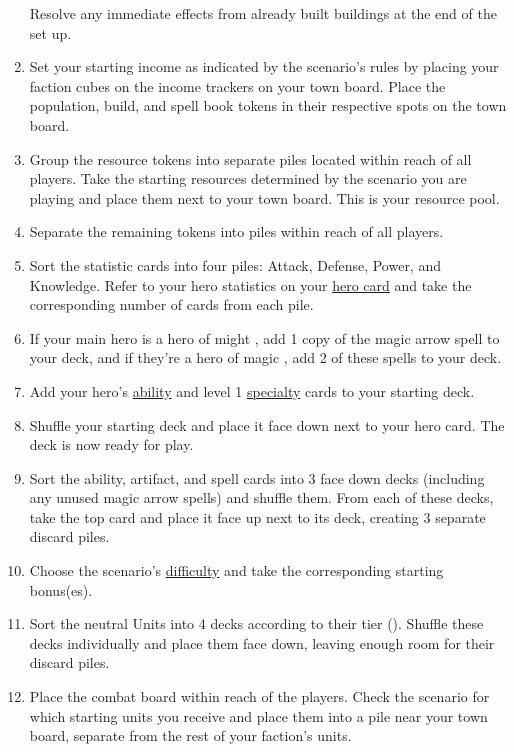 \begin{enumerate}
    Resolve any immediate effects from already built buildings at the end of the set up.
  \item Set your starting income as indicated by the scenario’s rules by placing your faction cubes on the income trackers on your town board.
    Place the population, build, and spell book tokens in their respective spots on the town board.
  \item Group the resource tokens into separate piles located within reach of all players.
    Take the starting resources determined by the scenario you are playing and place them next to your town board.
    This is your resource pool.
  \item Separate the remaining tokens into piles within reach of all players.
  \item Sort the statistic cards into four piles: Attack, Defense, Power, and Knowledge.
    Refer to your hero statistics on your \hyperlink{Herocard}{hero card} and take the corresponding number of cards from each pile.
  \item If your main hero is a hero of might , add 1 copy of the magic arrow spell to your deck, and if they’re a hero of magic , add 2 of these spells to your deck.
  \item Add your hero’s \hyperlink{Ability}{ability} and level 1 \hyperlink{Specialty}{specialty} cards to your starting deck.
  \item Shuffle your starting deck and place it face down next to your hero card.
    The deck is now ready for play.
  \item Sort the ability, artifact, and spell cards into 3 face down decks (including any unused magic arrow spells) and shuffle them.
    From each of these decks, take the top card and place it face up next to its deck, creating 3 separate discard piles.
  \item Choose the scenario’s \hyperlink{Difficulty}{difficulty} and take the corresponding starting bonus(es).
  \item Sort the neutral Units into 4 decks according to their tier ().
    Shuffle these decks individually and place them face down, leaving enough room for their discard piles.
  \item Place the combat board within reach of the players.
    Check the scenario for which starting units you receive and place them into a pile near your town board, separate from the rest of your faction’s units.

\end{enumerate}
